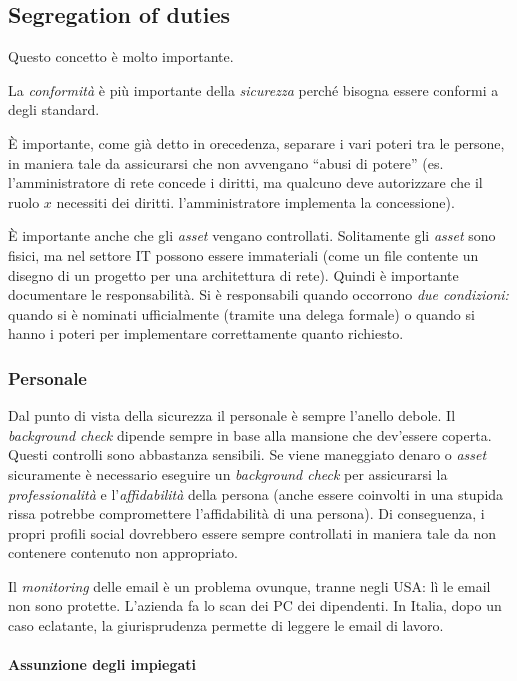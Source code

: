 \subsection{Segregation of duties}

Questo concetto è molto importante.

La \textit{conformità} è più importante della \textit{sicurezza} perché bisogna 
essere conformi a degli standard.

È importante, come già detto in orecedenza, separare i vari 
poteri tra le persone, in maniera tale da assicurarsi che non avvengano ``abusi 
di potere'' (es. l'amministratore di rete concede i diritti, ma qualcuno deve autorizzare che il 
ruolo $x$ necessiti dei diritti. l'amministratore implementa la concessione). 

È importante anche che gli \textit{asset} vengano controllati. Solitamente gli 
\textit{asset} sono fisici, ma nel settore IT possono essere immateriali (come 
un file contente un disegno di un progetto per una architettura di rete). Quindi 
è importante documentare le responsabilità. Si è responsabili quando occorrono 
\textit{due condizioni:} quando si è nominati ufficialmente (tramite una delega formale) o
quando si hanno i poteri per implementare correttamente quanto richiesto.

\subsubsection{Personale}

Dal punto di vista della sicurezza il personale è sempre l'anello debole. 
Il \textit{background check} dipende sempre in base alla mansione che 
dev'essere coperta. Questi controlli sono abbastanza sensibili.
Se viene maneggiato denaro o \textit{asset} sicuramente è necessario eseguire 
un \textit{background check} per assicurarsi la \textit{professionalità} e 
l'\textit{affidabilità} della persona (anche essere coinvolti in una stupida 
rissa potrebbe compromettere l'affidabilità di una persona). Di conseguenza, i propri 
profili social dovrebbero essere sempre controllati in maniera 
tale da non contenere contenuto non appropriato.

Il \textit{monitoring} delle email è un problema ovunque, tranne negli USA: 
lì le email non sono protette. L'azienda fa lo scan dei PC dei 
dipendenti. In Italia, dopo un caso eclatante, la giurisprudenza permette di 
leggere le email di lavoro.

\paragraph{Assunzione degli impiegati}

